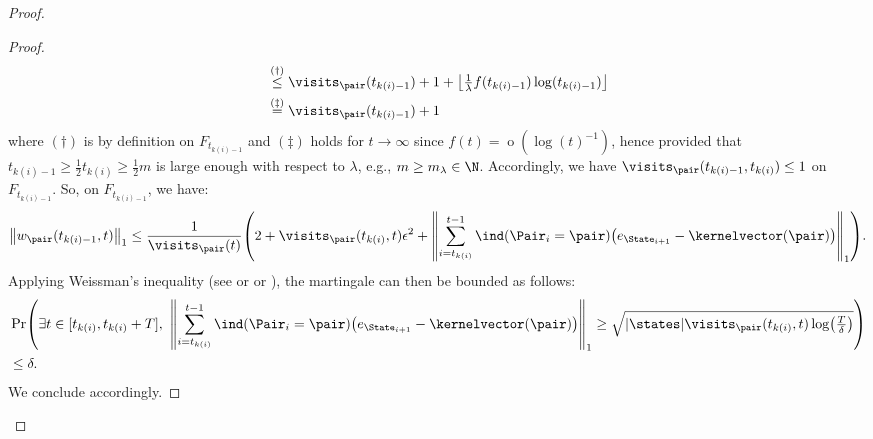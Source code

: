 \documentclass[preprint,cleveref,12pt]{colt2025}
\DeclarePairedDelimiter{\parens}{(}{)}	%
\DeclarePairedDelimiter{\abs}{\lvert}{\rvert}	%
\DeclarePairedDelimiter{\floor}{\lfloor}{\rfloor}	%
\DeclarePairedDelimiter{\norm}{\lVert}{\rVert}	%
\newcommand{\tsqrt}[1]{{\textstyle\sqrt{#1}}} %
\newcommand{\indic}[1]{\ind\parens{#1}}
\def\indicator{\indic}
\DeclareMathOperator*{\oh}{\mathrm{o}}
\def\kernel{\kernelvector}
\begin{document}
\begin{proof}
\begin{proof}
\begin{align*}
                & \overset{(\dagger)}\le
                \visits_\pair(t_{k(i)-1}) + 1 
                + \floor*{\tfrac 1\lambda f(t_{k(i)-1}) \log(t_{k(i)-1})}
                \\
                & \overset{(\ddagger)}=
                \visits_{\pair}(t_{k(i)-1}) + 1
            \end{align*}
            where $(\dagger)$ is by definition on $F_{t_{k(i)-1}}$ and $(\ddagger)$ holds for $t \to \infty$ since $f(t) = \oh(\log(t)^{-1})$, hence provided that $t_{k(i)-1} \ge \frac 12 t_{k(i)} \ge \frac 12 m$ is large enough with respect to $\lambda$, e.g., $m \ge m_\lambda \in \N$. 
            Accordingly, we have $\visits_\pair(t_{k(i)-1}, t_{k(i)}) \le 1$ on $F_{t_{k(i)-1}}$.
            So, on $F_{t_{k(i)-1}}$, we have:
            \begin{equation*}
                \norm*{w_\pair(t_{k(i)-1}, t)}_1
                \le 
                \frac 1{\visits_\pair(t)}
                \parens*{
                    2
                    + \visits_\pair(t_{k(i)}, t) \epsilon^2
                    +
                    \norm*{
                        \sum_{i=t_{k(i)}}^{t-1} \indicator{\Pair_i = \pair} \parens*{e_{\State_{i+1}}-\kernel(\pair)}
                    }_1
                }
                .
            \end{equation*}
            Applying Weissman's inequality (see \cite{weissman_inequalities_2003} or \cite[Equation~(44)]{auer_near_optimal_2009} or ), the martingale can then be bounded as follows:
            \begin{equation*}
            \begin{aligned}
                & 
                \Pr \parens*{
                    \exists t \in [t_{k(i)}, t_{k(i)}+T],
                    ~
                    \norm*{
                        \sum_{i=t_{k(i)}}^{t-1}
                        \indicator{\Pair_i = \pair} \parens*{e_{\State_{i+1}} - \kernel(\pair)}
                    }_1
                    \ge
                    \tsqrt{
                        \abs{\states} \visits_\pair(t_{k(i)}, t) \log\parens*{\tfrac T\delta}
                    }
                }
                \\
                & \le 
                \delta
                .
            \end{aligned}
            \end{equation*}
            We conclude accordingly.
        \end{proof}


\end{proof}
\end{document}
